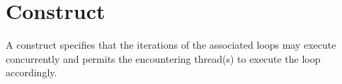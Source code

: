 %
%
%
%
%
%
%
%
%
%
%
%
%

\section{ Construct}
\label{sec:loop Construct}
\summary
  A  construct specifies that the iterations of the associated
  loops may execute concurrently and permits the encountering thread(s) to
  execute the loop accordingly.

